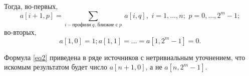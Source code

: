 Тогда, во-первых, 
\begin{equation}\label{eq2}
a[i+1,p]=\sum_{i-\text{профили}\; q,\, \text{близкие с}\; p}\ a[i,q] ,\,\,                        
i=1,\dots,n;\,\, p=0,…,2^m-1;     
\end{equation}
во-вторых,
\[a[1,0]=1; a[1,1]=\dots=a[1,2^m-1]=0.\]

Формула \eqref{eq2} приведена в ряде источников
 с нетривиальным уточнением, что искомым результатом будет число $a[n+1,0]$, 
а не $a[n,2^m-1]$.

%
